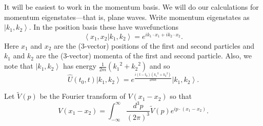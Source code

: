 \documentclass[11pt]{article}
\newcommand{\ket}[1]{\left|#1\right\rangle}
\newcommand{\braket}[2]{\left\langle#1|#2\right\rangle}
\newcommand{\op}[1]{\hat{#1}}
\theoremstyle{theorem}
\theoremstyle{remark}
\theoremstyle{step}
\theoremstyle{gap}
\begin{document}
It will be easiest to work in the momentum basis. We will do our calculations for momentum eigenstates---that is, plane waves. Write momentum eigenstates as \(\ket{k_1, k_2}\). In the position basis these have wavefunctions
\[\braket{x_1, x_2}{k_1, k_2} = e^{ik_1\cdot x_1 + ik_2\cdot x_2}.\]
Here \(x_1\) and \(x_2\) are the (3-vector) positions of the first and second particles and \(k_1\) and \(k_2\) are the (3-vector) momenta of the first and second particle. Also, we note that \(\ket{k_1, k_2}\) has energy \(\frac{1}{2m} \left({k_1}^2 + {k_2}^2\right)\) and so
\begin{equation}
\label{eq.timeevonk}
\op{U}(t_0, t) \ket{k_1, k_2} = e^{\frac{i\left(t-t_0\right)\left({k_1}^2 + {k_2}^2\right)}{2m\hbar}} \ket{k_1, k_2}.
\end{equation}

Let \(\widetilde{V}(p)\) be the Fourier transform of \(V(x_1 - x_2)\) so that
\begin{equation}
\label{eq.ftV}
V(x_1 - x_2) = \int_{-\infty}^{\infty} \frac{d^3 p}{(2 \pi)^3} \widetilde{V}(p) e^{ip\cdot(x_1 - x_2)}.
\end{equation}
\end{document}
